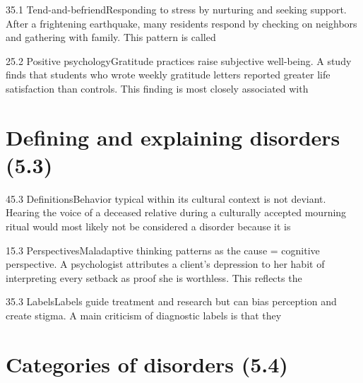 \documentclass[11pt]{article}
\begin{document}
\begin{q}{3}{5.1 Tend-and-befriend}{Responding to stress by nurturing and seeking support.}
After a frightening earthquake, many residents respond by checking on neighbors and gathering with family. This pattern is called
\end{q}

\begin{q}{2}{5.2 Positive psychology}{Gratitude practices raise subjective well-being.}
A study finds that students who wrote weekly gratitude letters reported greater life satisfaction than controls. This finding is most closely associated with
\end{q}

\section{Defining and explaining disorders (5.3)}

\begin{q}{4}{5.3 Definitions}{Behavior typical within its cultural context is not deviant.}
Hearing the voice of a deceased relative during a culturally accepted mourning ritual would most likely not be considered a disorder because it is
\end{q}

\begin{q}{1}{5.3 Perspectives}{Maladaptive thinking patterns as the cause = cognitive perspective.}
A psychologist attributes a client's depression to her habit of interpreting every setback as proof she is worthless. This reflects the
\end{q}

\begin{q}{3}{5.3 Labels}{Labels guide treatment and research but can bias perception and create stigma.}
A main criticism of diagnostic labels is that they
\end{q}

\section{Categories of disorders (5.4)}
\end{document}
